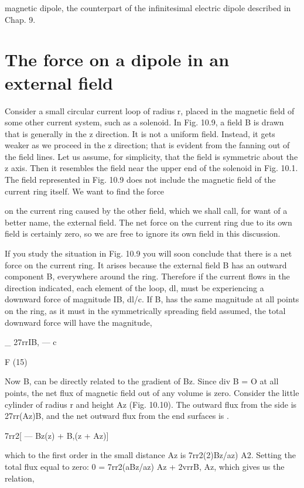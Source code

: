 {magnetic dipole, the counterpart of the infinitesimal electric dipole
described in Chap. 9.

\section{The force on a dipole in an external field}

Consider a small circular current loop of radius r, placed in the
magnetic field of some other current system, such as a solenoid. In
Fig. 10.9, a field B is drawn that is generally in the z direction. It is
not a uniform field. Instead, it gets weaker as we proceed in the
z direction; that is evident from the fanning out of the field lines.
Let us assume, for simplicity, that the field is symmetric about the
z axis. Then it resembles the field near the upper end of the solenoid
in Fig. 10.1. The field represented in Fig. 10.9 does not include the
magnetic field of the current ring itself. We want to find the force

on the current ring caused by the other field, which we shall call, for
want of a better name, the external field. The net force on the current
ring due to its own field is certainly zero, so we are free to ignore
its own field in this discussion.

If you study the situation in Fig. 10.9 you will soon conclude that
there is a net force on the current ring. It arises because the external
field B has an outward component B, everywhere around the ring.
Therefore if the current flows in the direction indicated, each element
of the loop, dl, must be experiencing a downward force of magnitude
IB, dl/c. If B, has the same magnitude at all points on the
ring, as it must in the symmetrically spreading field assumed, the
total downward force will have the magnitude,

_ 27rrIB,
 ---  c

F (15)

Now B, can be directly related to the gradient of Bz. Since
div B = O at all points, the net flux of magnetic field out of any
volume is zero. Consider the little cylinder of radius r and height Az
(Fig. 10.10). The outward flux from the side is 27rr(Az)B, and the
net outward flux from the end surfaces is .

7rr2[ --- Bz(z) + B,(z + Az)]

which to the first order in the small distance Az is 7rr2(2)Bz/az) A2.
Setting the total flux equal to zero: 0 = 7rr2(aBz/az) Az + 2vrrB, Az,
which gives us the relation,

}
